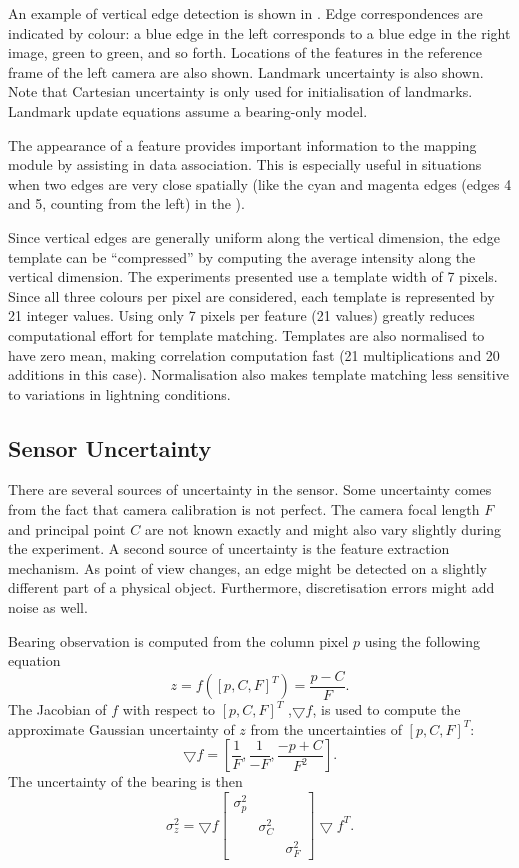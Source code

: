 An example of vertical edge detection is shown in
. Edge correspondences are
indicated by colour: a blue edge in the left corresponds to a blue
edge in the right image, green to green, and so forth. Locations of
the features in the reference frame of the left camera are also
shown. Landmark uncertainty is also shown. Note that Cartesian
uncertainty is only used for initialisation of landmarks. Landmark
update equations assume a bearing-only model.

The appearance of a feature provides important information to the
mapping module by assisting in data association. This is especially
useful in situations when two edges are very close spatially (like
the cyan and magenta edges (edges 4 and 5, counting from the left) in
the ).

Since vertical edges are generally uniform along the vertical
dimension, the edge template can be ``compressed'' by computing the
average intensity along the vertical dimension. The experiments
presented use a template width of 7 pixels. Since all three colours
per pixel are considered, each template is represented by 21 integer
values. Using only 7 pixels per feature (21 values) greatly reduces
computational effort for template matching. Templates are also
normalised to have zero mean, making correlation computation fast (21
multiplications and 20 additions in this case). Normalisation also
makes template matching less sensitive to variations in lightning
conditions.

\subsection{Sensor Uncertainty}

There are several sources of uncertainty in the sensor. Some
uncertainty comes from the fact that camera calibration is not
perfect. The camera focal length $F$ and principal point $C$ are not
known exactly and might also vary slightly during the experiment. A
second source of uncertainty is the feature extraction mechanism. As
point of view changes, an edge might be detected on a slightly
different part of a physical object. Furthermore, discretisation
errors might add noise as well.

Bearing observation is computed from the column pixel $p$ using the
following equation
$$
z = f([p,C,F]^T) = \frac{p - C}{F}.
$$
The Jacobian of $f$ with respect to $[p,C,F]^T$ ,$\bigtriangledown f$, is used to compute the
approximate Gaussian uncertainty of $z$ from the uncertainties of
$[p,C,F]^T$:
$$
\bigtriangledown f = \left[ 
\frac{1}{F},
\frac{1}{-F},
\frac{-p + C}{F^2}
\right].
$$
The uncertainty of the bearing is then 
$$
\sigma^2_z = \bigtriangledown f \left[ \begin{array}{ccc}
      \sigma^2_p & & \\
   &  \sigma^2_C & \\
  & & \sigma^2_F 
\end{array} \right] \bigtriangledown f^T.
$$



